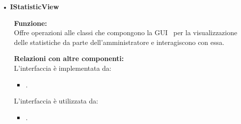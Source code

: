 {\begin{sloppypar}
{\begin{itemize}
\begin{itemize}
				\item[] \textbf{Metodi:}\\
					\texttt{+ LogAdmin(IUpdateViewLogic updateViewLogic, IWebSocketAdmin webSocket);}\\
					Costruttore: inizializza \texttt{logAdminLogic} con i valori ricevuti come parametri, imposta gli attributi degli oggetti che compongono la GUI\g~ e imposta come invisibile \texttt{LabelError}.\\

					\texttt{+ void loadViewLogAdmin();}\\
					Visualizza la GUI\g~ di autenticazione dell’amministratore e seleziona le impostazioni di default\g~: 
					\texttt{BoxUtente} e \texttt{BoxPassword} vuoti e \texttt{LabelError} invisibile.\\
					
					\texttt{+ void removeViewLogAdmin();}\\
					Nasconde la GUI\g~ di login.\\
					
					\texttt{+ void errorView(String error);}\\
					Imposta e rende visibile \texttt{LabelError} inserendo il contenuto della stringa \texttt{error}.\\
				
				\item[] \textbf{Eventi:}\\
					\texttt{@UiHandler void onLogUserSubmitClick(ClickEvent event);}\\
					All'evento \texttt{Click} dell'oggetto \texttt{LogUserSubmit} i dati inseriti all'interno dei campi \texttt{BoxUtente} e \texttt{BoxPassword} vengono inseriti in un vettore e inviati attraverso il riferimento \texttt{logAdminLogic} al metodo \texttt{validateData(Vector<String>)} per effettuare il controllo dei dati di autenticazione.\\
			\end{itemize}
		
		\item[•] \textbf{IStatisticView}
			\begin{itemize}
				\item[]  \textbf{Funzione:} \\
				Offre operazioni alle classi che compongono la GUI\g~ per la visualizzazione delle statistiche da parte dell’amministratore e interagiscono con essa.
				
				\item[]  \textbf{Relazioni con altre componenti:} \\
				L'interfaccia è implementata da:
				\begin{itemize}
					\item {}.
				\end{itemize}
				L’interfaccia è utilizzata da:
				\begin{itemize}
					\item {}.
				\end{itemize}


\end{itemize}
\end{itemize}}
\end{sloppypar}}
